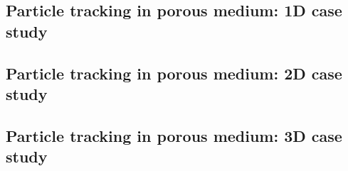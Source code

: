 


\subsection{Particle tracking in porous medium: 1D case study}
\label{RWPT:1D_aquifer}


\subsection{Particle tracking in porous medium: 2D case study}
\label{RWPT:2D_aquifer}


\subsection{Particle tracking in porous medium: 3D case study}
\label{RWPT:3D_aquifer}

